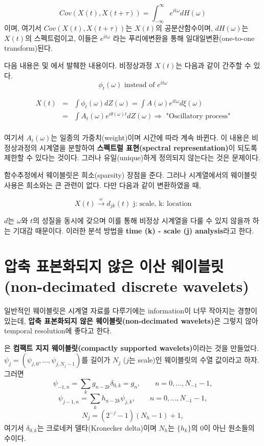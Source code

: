\documentclass[b5paper,]{scrbook}
\theoremstyle{plain}
\theoremstyle{definition}
\numberwithin{equation}{section}
\begin{document}
\[Cov(X(t), X(t+\tau))=\int_{-\infty}^{\infty}e^{it\omega}dH(\omega)\]
이며, 여기서 \(Cov(X(t), X(t+\tau))\)는 \(X(t)\)의 공분산함수이며,
\(dH(\omega)\)는 \(X(t)\)의 스펙트럼이고, 이들은 \(e^{it\omega}\) 라는
푸리에변환을 통해 일대일변환(one-to-one transform)된다.

다음 내용은 \citep{Priestley1981} 및 \citep{Dahlhaus1996}에서 발췌한
내용이다. 비정상과정 \(X(t)\)는 다음과 같이 간주할 수 있다.
\[\phi_{t}(\omega) \text{ instead of } e^{it\omega}\]

\begin{eqnarray*}
X(t)&=&\int \phi_{t}(\omega)dZ(\omega)=\int A(\omega)e^{it\omega}d\xi(\omega)\\
&=&\int A_{t}(\omega)e^{i\theta(\omega)t}dZ(\omega) \Longrightarrow \text{ "Oscillatory process"}\\
\end{eqnarray*}

여기서 \(A_{t}(\omega)\)는 일종의 가중치(weight)이며 시간에 따라 계속
바뀐다. 이 내용은 비정상과정의 시계열을 분할하여 \textbf{스펙트럴
표현(spectral representation)}이 되도록 제한할 수 있다는 것이다. 그러나
유일(unique)하게 정의되지 않는다는 것은 문제이다.

함수추정에서 웨이블릿은 희소(sparsity) 장점을 준다. 그러나 시계열에서의
웨이블릿 사용은 희소와는 큰 관련이 없다. 다만 다음과 같이 변환하였을 때,

\[X(t) \stackrel{\omega}{\rightarrow}d_{jk}(t) \text{ j: scale, k: location}\]

\(d\)는 \(\omega\)와 \(t\)의 성질을 동시에 갖으며 이를 통해 비정상
시계열을 다룰 수 있지 않을까 하는 기대감 때문이다. 이러한 분석 방법을
\textbf{time (k) - scale (j) analysis}라고 한다.

\section{압축 표본화되지 않은 이산 웨이블릿(non-decimated discrete
wavelets)}\label{----non-decimated-discrete-wavelets}

일반적인 웨이블릿은 시계열 자료를 다루기에는 information이 너무 작아지는
경향이 있는데, \textbf{압축 표본화되지 않은 웨이블릿(non-decimated
wavelets)}은 그렇지 않아 temporal resolution에 좋다고 한다.

\citep{Nason2000}은 \textbf{컴팩트 지지 웨이블릿(compactly supported
wavelets)}이라는 것을 만들었다.
\(\psi_{j}=(\psi_{j,0},\ldots,\psi_{j,N_{j}-1})\)를 길이가 \(N_{j}\)
(\(j\)는 scale)인 웨이블릿의 수열 값이라고 하자. 그러면
\[\psi_{-1,n}=\sum_{k}g_{n-2k}\delta_{0,k}=g_{n},\qquad{n=0,\ldots, N_{-1}-1},\]
\[\psi_{j-1,n}=\sum_{k}h_{n-2k}\psi_{j,k},\qquad{n=0,\ldots, N_{-1}-1},\]
\[N_{j}=(2^{-j}-1)(N_{h}-1)+1,\] 여기서 \(\delta_{0,k}\)는 크로네커
델타(Kronecker delta)이며 \(N_{h}\)는 \(\{h_{k}\}\)의 0이 아닌 원소들의
수이다.
\end{document}
